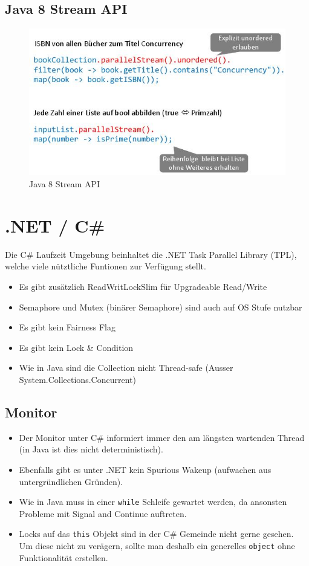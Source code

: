 \subsection{Java 8 Stream API}

\begin{figure}[h]
	\centering
	\includegraphics[width=0.7\linewidth]{img/java8_stream_api}
	\caption{Java 8 Stream API}
	\label{fig:java8streamapi}
\end{figure}


\section{.NET / C\#}
\lstset{style=visual-studio-style}
Die C\# Laufzeit Umgebung beinhaltet die .NET Task Parallel Library (TPL), welche viele nütztliche Funtionen zur Verfügung stellt. 

\begin{itemize}
	\item Es gibt zusätzlich ReadWritLockSlim für Upgradeable Read/Write
	\item Semaphore und Mutex (binärer Semaphore) sind auch auf OS Stufe nutzbar
	\item Es gibt kein Fairness Flag
	\item Es gibt kein Lock \& Condition
	\item Wie in Java sind die Collection nicht Thread-safe (Ausser System.Collections.Concurrent)
\end{itemize}

\subsection{Monitor}
\begin{itemize}
	\item Der Monitor unter C\# informiert immer den am längsten wartenden Thread (in Java ist dies nicht deterministisch).
	\item Ebenfalls gibt es unter .NET kein Spurious Wakeup (aufwachen aus untergründlichen Gründen).
	\item Wie in Java muss in einer \lstinline|while| Schleife gewartet werden, da ansonsten Probleme mit Signal and Continue auftreten. 
	\item Locks auf das \lstinline|this| Objekt sind in der C\# Gemeinde nicht gerne gesehen. Um diese nicht zu verägern, sollte man deshalb ein generelles \lstinline|object| ohne Funktionalität erstellen. 
\end{itemize}

